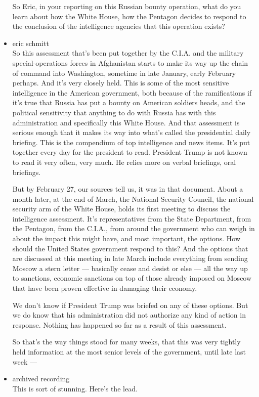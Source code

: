 \begin{itemize}
  So Eric, in your reporting on this Russian bounty operation, what do
  you learn about how the White House, how the Pentagon decides to
  respond to the conclusion of the intelligence agencies that this
  operation exists?
\item
  eric schmitt\\
  So this assessment that's been put together by the C.I.A. and the
  military special-operations forces in Afghanistan starts to make its
  way up the chain of command into Washington, sometime in late January,
  early February perhaps. And it's very closely held. This is some of
  the most sensitive intelligence in the American government, both
  because of the ramifications if it's true that Russia has put a bounty
  on American soldiers heads, and the political sensitivity that
  anything to do with Russia has with this administration and
  specifically this White House. And that assessment is serious enough
  that it makes its way into what's called the presidential daily
  briefing. This is the compendium of top intelligence and news items.
  It's put together every day for the president to read. President Trump
  is not known to read it very often, very much. He relies more on
  verbal briefings, oral briefings.

  But by February 27, our sources tell us, it was in that document.
  About a month later, at the end of March, the National Security
  Council, the national security arm of the White House, holds its first
  meeting to discuss the intelligence assessment. It's representatives
  from the State Department, from the Pentagon, from the C.I.A., from
  around the government who can weigh in about the impact this might
  have, and most important, the options. How should the United States
  government respond to this? And the options that are discussed at this
  meeting in late March include everything from sending Moscow a stern
  letter --- basically cease and desist or else --- all the way up to
  sanctions, economic sanctions on top of those already imposed on
  Moscow that have been proven effective in damaging their economy.

  We don't know if President Trump was briefed on any of these options.
  But we do know that his administration did not authorize any kind of
  action in response. Nothing has happened so far as a result of this
  assessment.

  So that's the way things stood for many weeks, that this was very
  tightly held information at the most senior levels of the government,
  until late last week ---
\item
  archived recording\\
  This is sort of stunning. Here's the lead.
\end{itemize}

